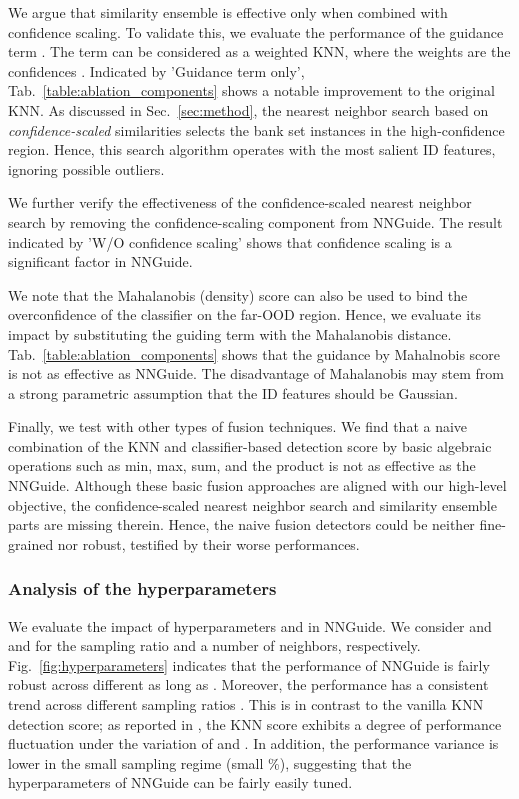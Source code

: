 \documentclass[10pt,twocolumn,letterpaper]{article}
\begin{document}
We argue that similarity ensemble is effective only when combined with confidence scaling. To validate this, we evaluate the performance of the guidance term . The term can be considered as a weighted KNN, where the weights are the confidences . Indicated by 'Guidance term only', Tab.~\ref{table:ablation_components} shows a notable improvement to the original KNN. As discussed in Sec.~\ref{sec:method}, the nearest neighbor search based on \textit{confidence-scaled} similarities selects the bank set instances in the high-confidence region. Hence, this search algorithm operates with the most salient ID features, ignoring possible outliers. 

We further verify the effectiveness of the confidence-scaled nearest neighbor search by removing the confidence-scaling component from NNGuide. The result indicated by 'W/O confidence scaling' shows that confidence scaling is a significant factor in NNGuide.

We note that the Mahalanobis (density) score can also be used to bind the overconfidence of the classifier on the far-OOD region. Hence, we evaluate its impact by substituting the guiding term with the Mahalanobis distance.
Tab.~\ref{table:ablation_components} shows that the guidance by Mahalnobis score is not as effective as NNGuide. The disadvantage of Mahalanobis may stem from a strong parametric assumption that the ID features should be Gaussian. 


Finally, we test with other types of fusion techniques. We find that a naive combination of the KNN and classifier-based detection score by basic algebraic operations such as min, max, sum, and the product is not as effective as the NNGuide. Although these basic fusion approaches are aligned with our high-level objective, the confidence-scaled nearest neighbor search and similarity ensemble parts are missing therein. Hence, the naive fusion detectors could be neither fine-grained nor robust, testified by their worse performances.

\subsubsection{Analysis of the hyperparameters}
\label{sec:exp_ablation_hyperparameters}
We evaluate the impact of hyperparameters  and  in NNGuide. We consider  and  and  for the sampling ratio and  a number of neighbors, respectively. 
Fig.~\ref{fig:hyperparameters} indicates that the performance of NNGuide is fairly robust across different  as long as . Moreover, the performance has a consistent trend across different sampling ratios .  This is in contrast to the vanilla KNN detection score; as reported in \cite{sun2022out}, the KNN score exhibits a degree of performance fluctuation under the variation of  and . In addition, the performance variance is lower in the small sampling regime (\ie small \%), suggesting that the hyperparameters of NNGuide can be fairly easily tuned.  
\end{document}

